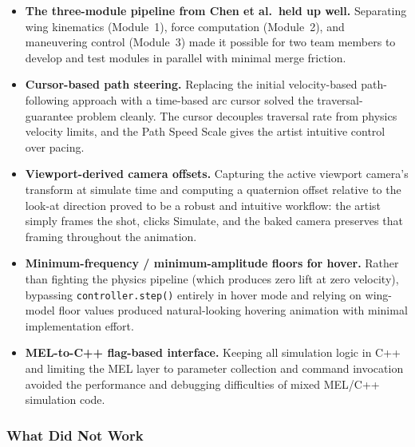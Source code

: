 \documentclass[12pt]{article}
\begin{document}
\begin{itemize}
  \item \textbf{The three-module pipeline from Chen et al.\ held up well.}
    Separating wing kinematics (Module~1), force computation (Module~2), and
    maneuvering control (Module~3) made it possible for two team members to
    develop and test modules in parallel with minimal merge friction.

  \item \textbf{Cursor-based path steering.} Replacing the initial
    velocity-based path-following approach with a time-based arc cursor solved
    the traversal-guarantee problem cleanly. The cursor decouples traversal
    rate from physics velocity limits, and the Path Speed Scale gives the
    artist intuitive control over pacing.

  \item \textbf{Viewport-derived camera offsets.} Capturing the active
    viewport camera's transform at simulate time and computing a quaternion
    offset relative to the look-at direction proved to be a robust and
    intuitive workflow: the artist simply frames the shot, clicks Simulate,
    and the baked camera preserves that framing throughout the animation.

  \item \textbf{Minimum-frequency / minimum-amplitude floors for hover.}
    Rather than fighting the physics pipeline (which produces zero lift at
    zero velocity), bypassing \texttt{controller.step()} entirely in hover
    mode and relying on wing-model floor values produced natural-looking
    hovering animation with minimal implementation effort.

  \item \textbf{MEL-to-C++ flag-based interface.} Keeping all simulation
    logic in C++ and limiting the MEL layer to parameter collection and
    command invocation avoided the performance and debugging difficulties of
    mixed MEL/C++ simulation code.
\end{itemize}

\subsubsection{What Did Not Work}
\end{document}
